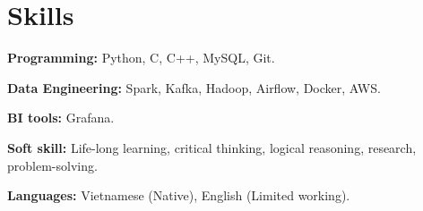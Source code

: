 \documentclass[letterpaper,11pt]{article}
\makeatletter
\newcommand{\resumeItem}[1]{
  \item\small{
    {#1 \vspace{-2pt}}
  }
}
\newcommand{\resumeSubheading}[4]{
  \vspace{-2pt}\item
    \begin{tabular*}{0.97\textwidth}[t]{l@{\extracolsep{\fill}}r}
      \textbf{#1} & #2 \\
      \textit{\small#3} & \textit{\small #4} \\
    \end{tabular*}\vspace{-7pt}
}
\newcommand{\resumeSubHeadingListStart}{\begin{itemize}[leftmargin=0.15in, label={}]}
\newcommand{\resumeSubHeadingListEnd}{\end{itemize}}
\newcommand{\resumeItemListStart}{\begin{itemize}}
\newcommand{\resumeItemListEnd}{\end{itemize}\vspace{-5pt}}
\makeatother
\begin{document}
\section{Skills}
\vspace{2pt}
\resumeSubHeadingListStart
  \small{\item{
      \textbf{Programming:}{ Python, C, C++, MySQL, Git.} \\ \vspace{3pt}
      
      
      \textbf{Data Engineering:}{ Spark, Kafka, Hadoop, Airflow, Docker, AWS.} \\ \vspace{3pt}

      \textbf{BI tools:}{ Grafana.} \\ \vspace{3pt}

      \textbf{Soft skill:}{ Life-long learning, critical thinking, logical reasoning, 
      research, problem-solving.} \\ \vspace{3pt}

      \textbf{Languages:}{ Vietnamese (Native), English (Limited working).}
      
  }}
\resumeSubHeadingListEnd


  
    
\end{document}
